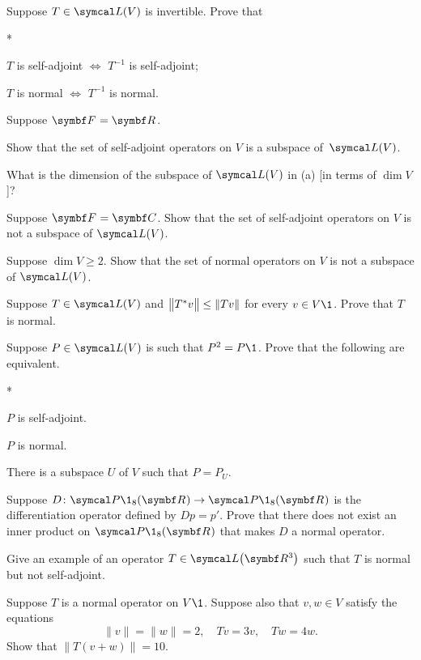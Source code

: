\begin{exercises}
\exercise
Suppose $T \in \L(V)$ is invertible. Prove that
\begin{subtheorem}*
\item
$T$ is self-adjoint $\iff$ $T^{-1}$ is self-adjoint;
\item
$T$ is normal $\iff$ $T^{-1}$ is normal.
\end{subtheorem}
\exercisesubtheoremend


\exercise
Suppose $\F{} = \R{}$.
\begin{subtheorem}
\item
Show that the set of self-adjoint operators on $V$ is a subspace of~$\L(V)$.
\item
What is the dimension of the subspace of $\L(V)$ in (a) [in terms of $\dim V$]?
\end{subtheorem}
\exercisesubtheoremend


\exercise
Suppose $\F{} = \C{}$. Show that the set of self-adjoint
operators on $V$ is not a subspace of $\L(V)$.


\exercise
Suppose $\dim V \ge 2$. Show that the set of normal operators on $V$ is not a
subspace of $\L(V)$.


\exercise
Suppose $T \in \L(V)$ and
$
\norm[\big]{T^*v } \le \| Tv \|$
for every $v \in V\1$. Prove that $T$ is normal.


\exercise
Suppose $P \in \L(V)$ is such that $P^2 = P\1$.  Prove that the following are equivalent.\label{7proj}
\begin{subtheorem}*
\item
$P$ is self-adjoint.
\item
$P$ is normal.
\item
There is a subspace $U$ of $V$ such that $P = P_{\!U}$.
\end{subtheorem}
\exercisesubtheoremend


\exercise
Suppose $\fun D {\P\1_8(\R{})} {\P\1_8(\R{})}$ is the differentiation operator defined by $Dp = p'\!$. Prove that there does not exist an inner product on $\P\1_8(\R{})$ that makes $D$ a  normal operator.


\exercise
Give an example of an operator $T \in \L\paren[\big]{\R{3}}$ such that $T$ is normal but not self-adjoint.


\exercise
Suppose $T$ is a normal operator on $V\1$. Suppose also that $v, w \in V$ satisfy the equations
\[
\|v\| = \|w \| = 2, \quad Tv = 3v, \quad Tw = 4w.
\]
Show that $\|T(v + w)\| = 10$.



\end{exercises}
